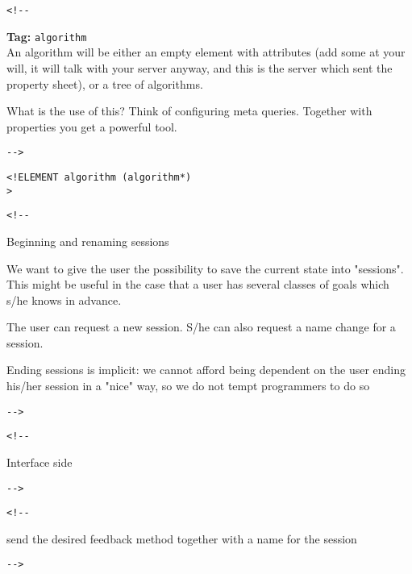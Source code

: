\documentclass{article}
\newcommand{\tagtitle}[1]{\textbf{Tag: }{\texttt{#1}}\\}
\begin{document}
\begin{verbatim}<!--\end{verbatim}
  

     \tagtitle{algorithm}
     An algorithm will be either an empty element with 
     attributes (add some at your will, it will talk with your 
     server anyway, and this is the server which sent the property 
     sheet), or a tree of algorithms.

     What is the use of this?
     Think of configuring meta queries. Together with properties
     you get a powerful tool.

       
 \begin{verbatim}-->\end{verbatim}



\begin{verbatim}
<!ELEMENT algorithm (algorithm*) 
>\end{verbatim}

\begin{verbatim}<!--\end{verbatim}
  

     Beginning and renaming sessions

     We want to give the user the possibility to save the current
     state into "sessions". This might be useful in the case that 
     a user has several classes of goals which s/he knows in advance.

     The user can request a new session.
     S/he can also request a name change for a session.
     
     Ending sessions is implicit:
     we cannot afford being dependent on the user ending
     his/her session in a "nice" way, so we do not 
     tempt programmers to do so 

       
 \begin{verbatim}-->\end{verbatim}



\begin{verbatim}<!--\end{verbatim}
  Interface side  
 \begin{verbatim}-->\end{verbatim}



\begin{verbatim}<!--\end{verbatim}
  send the desired feedback method together with 
       a name for the session  
 \begin{verbatim}-->\end{verbatim}
\end{document}

